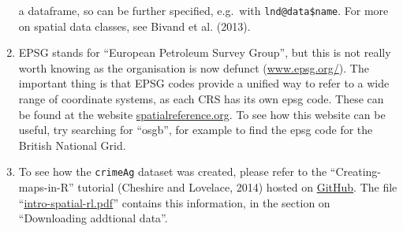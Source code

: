 \documentclass[]{article}
\begin{document}
\begin{enumerate}[1.]
  a dataframe, so can be further specified, e.g.~with
  \texttt{lnd@data\$name}. For more on spatial data classes, see Bivand
  et al. (2013).
\item
  EPSG stands for ``European Petroleum Survey Group'', but this is not
  really worth knowing as the organisation is now defunct
  (\href{http://www.epsg.org/}{www.epsg.org/}). The important thing is
  that EPSG codes provide a unified way to refer to a wide range of
  coordinate systems, as each CRS has its own epsg code. These can be
  found at the website
  \href{http://spatialreference.org/}{spatialreference.org}. To see how
  this website can be useful, try searching for ``osgb'', for example to
  find the epsg code for the British National Grid.
\item
  To see how the \texttt{crimeAg} dataset was created, please refer to
  the ``Creating-maps-in-R'' tutorial (Cheshire and Lovelace, 2014)
  hosted on
  \href{https://github.com/Robinlovelace/Creating-maps-in-R}{GitHub}.
  The file
  ``\href{https://github.com/Robinlovelace/Creating-maps-in-R/blob/master/intro-spatial-rl.pdf}{intro-spatial-rl.pdf}''
  contains this information, in the section on ``Downloading addtional
  data''.
\end{enumerate}
\end{document}
